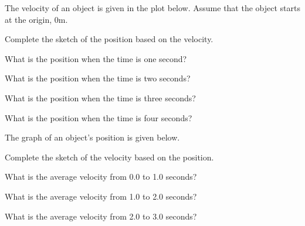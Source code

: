 \begin{problem}
\item The velocity of an object is given in the plot below.  Assume
  that the object starts at the origin, 0m.

  \begin{subproblem}
  \item Complete the sketch of the position based on the velocity.

    \scalebox{0.8}{}

    \item What is the position when the time is one second?
      \vspace{3em}

    \item What is the position when the time is two seconds?
      \vspace{3em}

    \item What is the position when the time is three seconds?
      \vspace{3em}

    \item What is the position when the time is four seconds?
      \vspace{3em}

  \end{subproblem}

  \clearpage

\item The graph of an object's position is given below. 

  \begin{subproblem}
  \item Complete the sketch of the velocity based on the position.

    \scalebox{0.8}{}

    \item What is the average velocity from 0.0 to 1.0  seconds?
      \vspace{3em}

    \item What is the average velocity from 1.0 to 2.0  seconds?
      \vspace{3em}

    \item What is the average velocity from 2.0 to 3.0  seconds?
      \vspace{3em}


\end{subproblem}
\end{problem}
